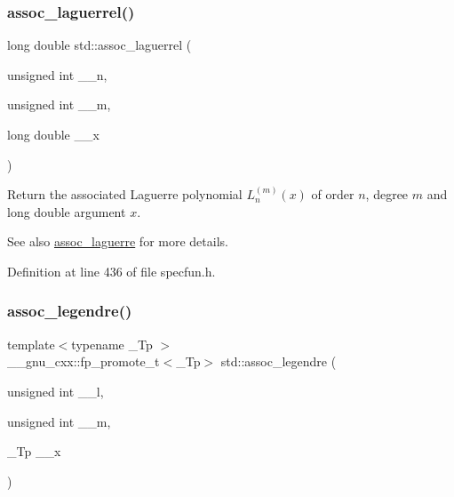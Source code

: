 \subsubsection{\texorpdfstring{assoc\+\_\+laguerrel()}{assoc\_laguerrel()}}
{\footnotesize\ttfamily long double std\+::assoc\+\_\+laguerrel (\begin{DoxyParamCaption}\item[{unsigned int}]{\+\_\+\+\_\+n,  }\item[{unsigned int}]{\+\_\+\+\_\+m,  }\item[{long double}]{\+\_\+\+\_\+x }\end{DoxyParamCaption})\hspace{0.3cm}{\ttfamily [inline]}}

Return the associated Laguerre polynomial $ L_n^{(m)}(x) $ of order $ n $, degree $ m $ and {\ttfamily long double} argument $ x $.

\begin{DoxySeeAlso}{See also}
\hyperlink{group__cxx17__math__spec__func_ga0b33e0ac3066f2353861ce2f34b43f57}{assoc\+\_\+laguerre} for more details. 
\end{DoxySeeAlso}


Definition at line 436 of file specfun.\+h.

\mbox{\label{group__cxx17__math__spec__func_ga7aa4182446f687094b12688078517d53}} 
\subsubsection{\texorpdfstring{assoc\+\_\+legendre()}{assoc\_legendre()}}
{\footnotesize\ttfamily template$<$typename \+\_\+\+Tp $>$ \\
\+\_\+\+\_\+gnu\+\_\+cxx\+::fp\+\_\+promote\+\_\+t$<$\+\_\+\+Tp$>$ std\+::assoc\+\_\+legendre (\begin{DoxyParamCaption}\item[{unsigned int}]{\+\_\+\+\_\+l,  }\item[{unsigned int}]{\+\_\+\+\_\+m,  }\item[{\+\_\+\+Tp}]{\+\_\+\+\_\+x }\end{DoxyParamCaption})\hspace{0.3cm}{\ttfamily [inline]}}

